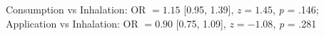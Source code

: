 Consumption vs Inhalation: OR $=1.15$ [0.95, 1.39], $z=1.45$, \textit{p} = .146; Application vs Inhalation: OR $=0.90$ [0.75, 1.09], $z=-1.08$, \textit{p} = .281%
